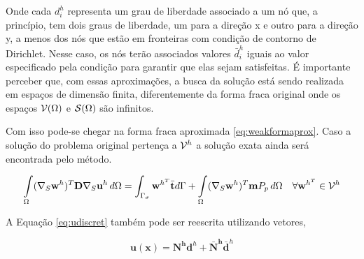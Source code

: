 Onde cada $d_i^h$ representa um grau de liberdade associado a um nó que, a princípio, tem dois graus de liberdade, um para a direção x e outro para a direção y, a menos dos nós que estão em fronteiras com condição de contorno de Dirichlet. Nesse caso, os nós terão associados valores $\bar{d}_i^h$  iguais ao valor especificado pela condição para garantir que elas sejam satisfeitas. É importante perceber que, com essas aproximações, a busca da solução está sendo realizada em espaços de dimensão finita, diferentemente da forma fraca original onde os espaços $\mathcal{V}(\Omega)$ e $\mathcal{S}(\Omega)$ são infinitos.


Com isso pode-se chegar na forma fraca aproximada \eqref{eq:weakformaprox}. Caso a solução do problema original pertença a $\mathcal{V}^h$ a solução exata ainda será encontrada pelo método.

\begin{equation}\label{eq:weakformaprox}
\int\limits_{\Omega}  (\nabla_S \mathbf{w}^h)^T \mathbf{D} \nabla_S  \mathbf{u}^h \, d\Omega  =  \int_{\Gamma_\sigma} \mathbf{w}^{h^T} \bar{\mathbf{t}} d\Gamma  +  \int\limits_{\Omega} (\nabla_S\mathbf{w}^h)^T \mathbf{m} P_p \, d\Omega  \quad \forall \mathbf{w}^{h^T} \in \mathcal{V}^h
\end{equation}




A Equação \eqref{eq:udiscret} também pode ser reescrita utilizando vetores,

\begin{equation}\label{eq:udiscretvetor}
\mathbf{u}(\mathbf{x}) = \mathbf{N^h} \mathbf{d}^h + \mathbf{\bar{N}^h} \mathbf{\bar{d}}^h
\end{equation}

